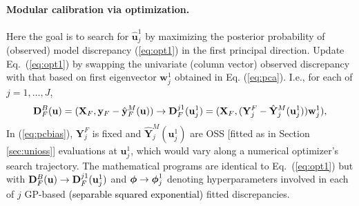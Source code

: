 \documentclass[12pt]{article}
\newcommand{\blu}[1]{\textcolor{black}{#1}} %
\newcommand{\blunew}[1]{\textcolor{black}{#1}} %
\newcommand{\bm}[1]{\mbox{\boldmath $#1$}}
\begin{document}

\paragraph{Modular calibration via optimization.} Here the goal is to search
for $\hat{\mathbf{u}}_j^1$ by maximizing the posterior probability of
(observed) model discrepancy (\ref{eq:opt1}) in the first principal direction.
Update Eq.~(\ref{eq:opt1}) by swapping the univariate (column vector) observed
discrepancy with that based on first eigenvector $\mathbf{w}^1_j$ obtained in
Eq. (\ref{eq:pca}). I.e., for each of $j=1, \dots, J$,
 \begin{align}
\mathbf{D}^{B}_{\blunew{F}}(\mathbf{u}) =( \mathbf{X}_{\blunew{F}},  
 \mathbf{y}_{\blunew{F}} - \hat{\mathbf{y}}^M_{\blunew{F}}({\mathbf{u}}))
 \rightarrow
 \mathbf{D}^{j1}_{\blunew{F}}(\mathbf{u}_j^1) =( \mathbf{X}_{\blunew{F}},  
(\mathbf{Y}_j^F - \hat{\mathbf{Y}}_j^M(\mathbf{u}_j^1) ) \mathbf{w}^1_j ),  
\label{eq:pcbias}
\end{align}
In (\ref{eq:pcbias}),  $\mathbf{Y}_j^F$ is fixed and
$\hat{\mathbf{Y}}_j^M(\mathbf{u}_j^1)$ are OSS [fitted as in Section
\ref{sec:unioss}] evaluations at $\mathbf{u}_j^1$, which would vary along a
numerical optimizer's search trajectory. The mathematical programs
are identical to Eq.~(\ref{eq:opt1}) but with
$\mathbf{D}^{B}_{\blunew{F}}(\mathbf{u}) \rightarrow
\mathbf{D}^{j1}_{\blunew{F}}(\mathbf{u}_j^1)$ and $\bm{\phi} \rightarrow \bm{\phi}_j^1$
denoting hyperparameters involved in each of $j$ GP-based \blu{(separable
squared exponential)} fitted discrepancies.
 
\end{document}
